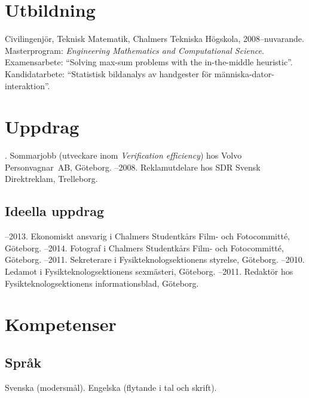 \documentclass{skvitae}
\author{Simon Sigurdhsson}
\affiliation{}
\begin{document}
	\RaggedRight
	\maketitle


	\section{Utbildning}
	\ind Civilingenjör, Teknisk Matematik, Chalmers Tekniska Högskola, 2008--nuvarande.%
	\ind Masterprogram: \emph{Engineering Mathematics and Computational Science}.%
	\ind Examensarbete: \foreignquote{english}{Solving max-sum problems with the in-the-middle heuristic}.%
	\ind Kandidatarbete: \enquote{Statistisk bildanalys av handgester för människa-dator-interaktion}.

	\section{Uppdrag}
	. Sommarjobb (utveckare inom \emph{Verification efficiency}) hos Volvo Person\-vagnar~AB, Göteborg.
	--2008. Reklamutdelare hos SDR Svensk Direktreklam, Trelleborg.

	\medskip
	\subsection{Ideella uppdrag}
	--2013. Ekonomiskt ansvarig i Chalmers Studentkårs Film- och Fotocommitté, Göteborg.
	--2014. Fotograf i Chalmers Studentkårs Film- och Fotocommitté, Göteborg.
	--2011. Sekreterare i Fysikteknologsektionens styrelse, Göteborg.
	--2010. Ledamot i Fysikteknologsektionens sexmästeri, Göteborg.
	--2011. Redaktör hos Fysikteknologsektionens informationsblad, Göteborg.

	\section{Kompetenser}
	\subsection{Språk}
	\ind Svenska (modersmål).
	\ind Engelska (flytande i tal och skrift).
\end{document}

